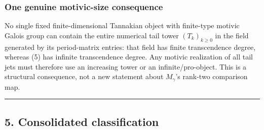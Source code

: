 \subsubsection{One genuine motivic-size consequence}

No single fixed finite-dimensional Tannakian object with finite-type motivic
Galois group can contain the entire numerical tail tower \((T_k)_{k\ge0}\)
in the field generated by its period-matrix entries: that field has finite
transcendence degree, whereas (5) has infinite transcendence degree. Any
motivic realization of all tail jets must therefore use an increasing tower
or an infinite/pro-object. This is a structural consequence, not a new
statement about \(M_\gamma\)'s rank-two comparison map.

\begin{center}\rule{0.5\linewidth}{0.5pt}\end{center}

\subsection{5. Consolidated classification}


